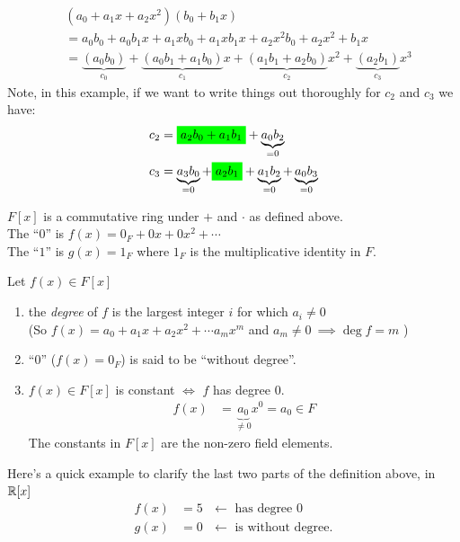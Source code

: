 \begin{example}
    \begin{align}
        &(a_0 + a_1x + a_2x^2)(b_0 + b_1x) \nonumber  \\
        &= a_0b_0 + a_0b_1x + a_1x b_0 + a_1xb_1x + a_2x^2b_0 + a_2x^2+b_1x \nonumber \\
        &= \underbrace{(a_0b_0)}_{c_0} + \underbrace{(a_0b_1+a_1b_0)}_{c_1}x + \underbrace{(a_1b_1+a_2b_0)}_{c_2}x^2+ \underbrace{(a_2b_1)}_{c_3}x^3 \nonumber
    \end{align}
    Note, in this example, if we want to write things out thoroughly for $c_2$ and $c_3$ we have:
    \begin{align}
        c_2 &= \colorbox{green}{$a_2b_0 + a_1b_1$}+\underbrace{a_0b_2}_{=0} \nonumber \\
        c_3 &= \underbrace{a_3b_0}_{=0}+ \colorbox{green}{$a_2b_1$}+ \underbrace{a_1b_2}_{=0} + \underbrace{a_0b_3}_{=0} \nonumber
    \end{align}
\end{example}
$F[x]$ is a commutative ring under $+$ and $\cdot$ as defined above. \\
\noindent The ``$0$'' is $f(x) = 0_F+ 0x + 0x^2 + \cdots  $ \\
\noindent The ``$1$'' is $g(x) = 1_F$ where $1_F$ is the multiplicative identity in $F$. \\
\begin{definition}
    Let $f(x) \in F[x]$
    \begin{enumerate}
        \item the \textit{degree} of $f$ is the largest integer $i$ for which $a_i \neq 0$ \\
        \steezybreak
        (So $f(x) = a_0 + a_1x + a_2x^2 + \cdots a_mx^m$ and $a_m \neq 0 \ \implies \deg f = m$ )
        \item ``$0$'' ($f(x)=0_F$) is said to be ``without degree''.
        \item $f(x)\in F[x]$ is constant $\iff$ $f$ has degree $0$.
        \begin{align}
            f(x) &= \underbrace{a_0}_{\neq 0} x^0 = a_0 \in F \nonumber
        \end{align}
        The constants in $F[x]$ are the non-zero field elements.
    \end{enumerate}
\end{definition}
Here's a quick example to clarify the last two parts of the definition above, in ${\mathbb{R}}[x]$
\begin{align}
    f(x)&=5 \ \ \ \leftarrow \text{ has degree }0 \nonumber \\
    g(x)&=0 \ \ \ \leftarrow \text{ is without degree}. \nonumber
\end{align}

